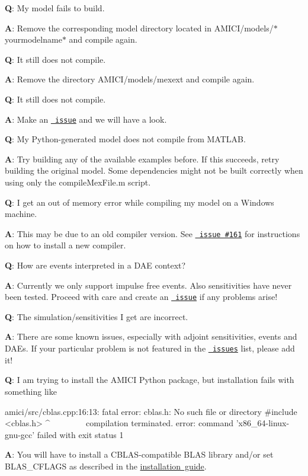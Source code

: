 {\bfseries{Q}}\+: My model fails to build.

{\bfseries{A}}\+: Remove the corresponding model directory located in A\+M\+I\+C\+I/models/$\ast$yourmodelname$\ast$ and compile again.



{\bfseries{Q}}\+: It still does not compile.

{\bfseries{A}}\+: Remove the directory A\+M\+I\+C\+I/models/{\ttfamily mexext} and compile again.



{\bfseries{Q}}\+: It still does not compile.

{\bfseries{A}}\+: Make an \href{https://github.com/ICB-DCM/AMICI/issues}{\texttt{ issue}} and we will have a look.



{\bfseries{Q}}\+: My Python-\/generated model does not compile from M\+A\+T\+L\+AB.

{\bfseries{A}}\+: Try building any of the available examples before. If this succeeds, retry building the original model. Some dependencies might not be built correctly when using only the {\ttfamily compile\+Mex\+File.\+m} script.



{\bfseries{Q}}\+: I get an out of memory error while compiling my model on a Windows machine.

{\bfseries{A}}\+: This may be due to an old compiler version. See \href{https://github.com/ICB-DCM/AMICI/issues/161}{\texttt{ issue \#161}} for instructions on how to install a new compiler.



{\bfseries{Q}}\+: How are events interpreted in a D\+AE context?

{\bfseries{A}}\+: Currently we only support impulse free events. Also sensitivities have never been tested. Proceed with care and create an \href{https://github.com/ICB-DCM/AMICI/issues}{\texttt{ issue}} if any problems arise!



{\bfseries{Q}}\+: The simulation/sensitivities I get are incorrect.

{\bfseries{A}}\+: There are some known issues, especially with adjoint sensitivities, events and D\+A\+Es. If your particular problem is not featured in the \href{https://github.com/ICB-DCM/AMICI/issues}{\texttt{ issues}} list, please add it!



{\bfseries{Q}}\+: I am trying to install the A\+M\+I\+CI Python package, but installation fails with something like \begin{DoxyVerb}amici/src/cblas.cpp:16:13: fatal error: cblas.h: No such file or directory
#include <cblas.h>
         ^~~~~~~~~
compilation terminated.
error: command 'x86_64-linux-gnu-gcc' failed with exit status 1
\end{DoxyVerb}


{\bfseries{A}}\+: You will have to install a C\+B\+L\+A\+S-\/compatible B\+L\+AS library and/or set {\ttfamily B\+L\+A\+S\+\_\+\+C\+F\+L\+A\+GS} as described in the \mbox{\hyperlink{md__i_n_s_t_a_l_l}{installation guide}}. 